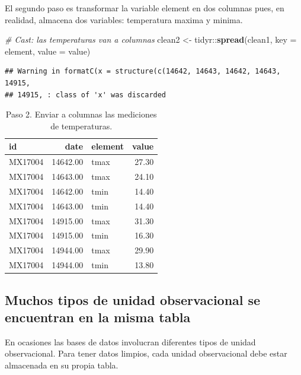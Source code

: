 \documentclass[]{article}
\newenvironment{Shaded}{\begin{snugshade}}{\end{snugshade}}
\newcommand{\KeywordTok}[1]{\textcolor[rgb]{0.13,0.29,0.53}{\textbf{{#1}}}}
\newcommand{\DataTypeTok}[1]{\textcolor[rgb]{0.13,0.29,0.53}{{#1}}}
\newcommand{\StringTok}[1]{\textcolor[rgb]{0.31,0.60,0.02}{{#1}}}
\newcommand{\CommentTok}[1]{\textcolor[rgb]{0.56,0.35,0.01}{\textit{{#1}}}}
\newcommand{\NormalTok}[1]{{#1}}
\begin{document}
El segundo paso es transformar la variable element en dos columnas pues,
en realidad, almacena dos variables: temperatura maxima y minima.

\begin{Shaded}
\begin{Highlighting}[]
\CommentTok{# Cast: las temperaturas van a columnas}
\NormalTok{clean2 <-}\StringTok{ }\NormalTok{tidyr::}\KeywordTok{spread}\NormalTok{(clean1, }\DataTypeTok{key =} \NormalTok{element, }\DataTypeTok{value =} \NormalTok{value)}
\end{Highlighting}
\end{Shaded}

\begin{verbatim}
## Warning in formatC(x = structure(c(14642, 14643, 14642, 14643, 14915,
## 14915, : class of 'x' was discarded
\end{verbatim}

\begin{table}[ht]
\centering
\begin{tabular}{lrlr}
  \hline
id & date & element & value \\ 
  \hline
MX17004 & 14642.00 & tmax & 27.30 \\ 
  MX17004 & 14643.00 & tmax & 24.10 \\ 
  MX17004 & 14642.00 & tmin & 14.40 \\ 
  MX17004 & 14643.00 & tmin & 14.40 \\ 
  MX17004 & 14915.00 & tmax & 31.30 \\ 
  MX17004 & 14915.00 & tmin & 16.30 \\ 
  MX17004 & 14944.00 & tmax & 29.90 \\ 
  MX17004 & 14944.00 & tmin & 13.80 \\ 
   \hline
\end{tabular}
\caption{Paso 2. Enviar a columnas las mediciones de temperaturas.} 
\label{tab:clima1}
\end{table}

\subsection{Muchos tipos de unidad observacional se encuentran en la
misma
tabla}\label{muchos-tipos-de-unidad-observacional-se-encuentran-en-la-misma-tabla}

En ocasiones las bases de datos involucran diferentes tipos de unidad
observacional. Para tener datos limpios, cada unidad observacional debe
estar almacenada en su propia tabla.
\end{document}
